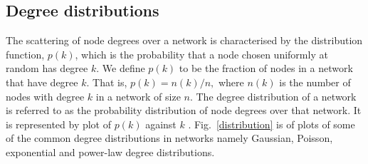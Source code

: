 \documentclass[10pt,a4paper]{article}
\newtheorem{exa}{Example}
\begin{document}
\subsection{Degree distributions}
The scattering of node degrees over a network is characterised by the distribution function, $p(k)$, which is the probability that a node chosen uniformly at random has degree $k$. We define $p(k)$ to be the fraction of nodes in a network that have degree $k$. That is, $p(k) = n(k)/n,$ where $n(k)$ is the number of nodes with degree $k$ in a network of size $n$. The degree distribution of a network is  referred to as the probability distribution of node degrees over that network. It is represented by plot of $p(k)$ against $k$ \citep{estrada2011structure}. Fig.~\ref{distribution} is of plots of some of the common degree distributions in networks namely Gaussian, Poisson, exponential and power-law degree distributions.

%	
%
\end{document}
